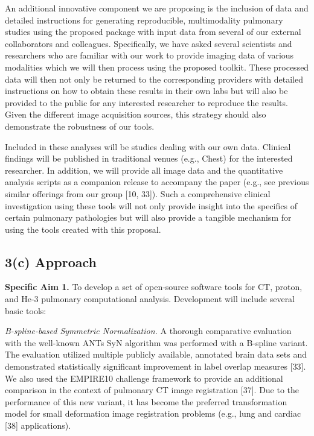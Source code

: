 \documentclass[11pt,]{article}
\begin{document}
An additional innovative component we are proposing is the inclusion of
data and detailed instructions for generating reproducible,
multimodality pulmonary studies using the proposed package with input
data from several of our external collaborators and colleagues.
Specifically, we have asked several scientists and researchers who are
familiar with our work to provide imaging data of various modalities
which we will then process using the proposed toolkit. These processed
data will then not only be returned to the corresponding providers with
detailed instructions on how to obtain these results in their own labs
but will also be provided to the public for any interested researcher to
reproduce the results. Given the different image acquisition sources,
this strategy should also demonstrate the robustness of our tools.

Included in these analyses will be studies dealing with our own data.
Clinical findings will be published in traditional venues (e.g., Chest)
for the interested researcher. In addition, we will provide all image
data and the quantitative analysis scripts as a companion release to
accompany the paper (e.g., see previous similar offerings from our group
{[}10, 33{]}). Such a comprehensive clinical investigation using these
tools will not only provide insight into the specifics of certain
pulmonary pathologies but will also provide a tangible mechanism for
using the tools created with this proposal.

\subsection{\textbf{3(c) Approach}}\label{c-approach}

\textbf{Specific Aim 1.} To develop a set of open-source software tools
for CT, proton, and He-3 pulmonary computational analysis. Development
will include several basic tools:

\emph{B-spline-based Symmetric Normalization.} A thorough comparative
evaluation with the well-known ANTs SyN algorithm was performed with a
B-spline variant. The evaluation utilized multiple publicly available,
annotated brain data sets and demonstrated statistically significant
improvement in label overlap measures {[}33{]}. We also used the
EMPIRE10 challenge framework to provide an additional comparison in the
context of pulmonary CT image registration {[}37{]}. Due to the
performance of this new variant, it has become the preferred
transformation model for small deformation image registration problems
(e.g., lung and cardiac {[}38{]} applications).
\end{document}
